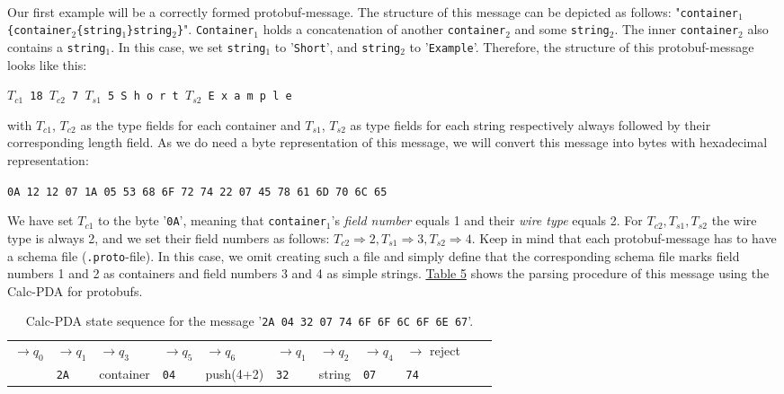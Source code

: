 \\Our first example will be a correctly formed protobuf-message. The structure of this message can be depicted as follows: "\texttt{container$_1$\{container$_2$\{string$_1$\}string$_2$\}}". \texttt{Container$_1$} holds a concatenation of another \texttt{container$_2$} and some \texttt{string$_2$}. The inner \texttt{container$_2$} also contains a \texttt{string$_1$}. In this case, we set \texttt{string$_1$} to '\texttt{Short}', and \texttt{string$_2$} to '\texttt{Example}'. Therefore, the structure of this protobuf-message looks like this: 
\begin{center}
    \texttt{$T_{c1}$ 18 $T_{c2}$ 7 $T_{s1}$ 5 S h o r t $T_{s2}$ E x a m p l e}
\end{center} with $T_{c1}$, $T_{c2}$ as the type fields for each container and $T_{s1}$, $T_{s2}$ as type fields for each string respectively always followed by their corresponding length field. As we do need a byte representation of this message, we will convert this message into bytes with hexadecimal representation:
\begin{center}
    \texttt{0A 12 12 07 1A 05 53 68 6F 72 74 22 07 45 78 61 6D 70 6C 65}
\end{center}
We have set $T_{c1}$ to the byte '\texttt{0A}', meaning that \texttt{container$_1$}'s \textit{field number} equals 1 and their \textit{wire type} equals 2. For $T_{c2}, T_{s1}, T_{s2}$ the wire type is always 2, and we set their field numbers as follows: $T_{c2} \Rightarrow 2, T_{s1} \Rightarrow 3, T_{s2} \Rightarrow 4$. Keep in mind that each protobuf-message has to have a schema file (\texttt{.proto}-file). In this case, we omit creating such a file and simply define that the corresponding schema file marks field numbers 1 and 2 as containers and field numbers 3 and 4 as simple strings. \hyperref[tab:tab5-protobuf-1-Calc-pda-state-sequence]{Table 5} shows the parsing procedure of this message using the Calc-PDA for protobufs.\\
\begin{table}
    \centering
    \begin{tabular}{|lllllllllll|}\hline
         $\rightarrow q_0$ &$\rightarrow q_1$ & $\rightarrow q_3$ & $\rightarrow q_5$ & $\rightarrow q_6$ & $\rightarrow q_1$ & $\rightarrow q_2$ & $\rightarrow q_4$ & $\rightarrow$ \tiny{reject} & & \\
        & \texttt{2A} &\tiny{container} &\texttt{04} & \tiny{push(4+2)} & \texttt{32} & \tiny{string} & \texttt{07} & \texttt{74} &  & \\[10pt]\hline
    \end{tabular}
    \caption{Calc-PDA state sequence for the message '\texttt{2A 04 32 07 74 6F 6F 6C 6F 6E 67}'.}
    \label{tab:tab6-protobuf-2-Calc-pda-state-sequence}
\end{table}
